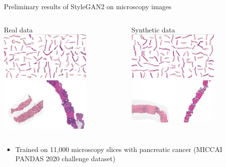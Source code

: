\documentclass[8pt,xcolor=table,aspectratio=169]{beamer}
\begin{document}
\begin{frame}{Preliminary results of StyleGAN2 on microscopy images}
\begin{columns}
\begin{column}{0.5\textwidth}
\centering
Real data\\
\includegraphics[width=0.7\textwidth]{OlyuTVC.jpg}
\includegraphics[width=0.7\textwidth]{tzfv0KE.png}
\end{column}
\begin{column}{0.5\textwidth}
\centering
Synthetic data\\
\includegraphics[width=0.7\textwidth]{4GxUSWE.jpg} 
\includegraphics[width=0.7\textwidth]{DDQ740K.png} 

\end{column}
\end{columns}

\begin{itemize}
\item Trained on 11,000 microscopy slices with pancreatic cancer (MICCAI PANDAS 2020 challenge dataset)
\end{itemize}
\vspace{1em}

\end{frame}
\end{document}
